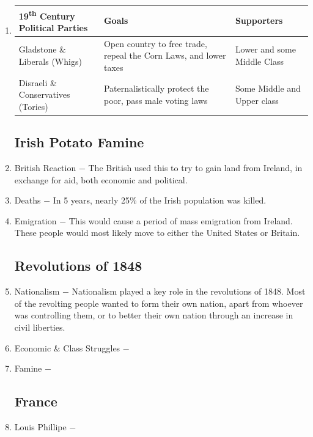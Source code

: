 \documentclass[12pt]{article}
\begin{document}
\begin{enumerate}
\item \begin{tabular}{p{} p{} p{}}
\hline
19\textsuperscript{th} Century Political Parties & Goals & Supporters \\
\hline
Gladstone \& Liberals (Whigs) & Open country to free trade, repeal the Corn Laws, and lower taxes & Lower and some Middle Class  \\
\hline
Disraeli \& Conservatives (Tories) & Paternalistically protect the poor, pass male voting laws & Some Middle and Upper class \\
\hline
\end{tabular}

\subsection{Irish Potato Famine}

\item British Reaction $-$ The British used this to try to gain land from Ireland, in exchange for aid, both economic and political. 

\item Deaths $-$ In 5 years, nearly 25\% of the Irish population was killed.

\item Emigration $-$ This would cause a period of mass emigration from Ireland. These people would most likely move to either the United States or Britain.

\subsection{Revolutions of 1848}

\item Nationalism $-$ Nationalism played a key role in the revolutions of 1848. Most of the revolting people wanted to form their own nation, apart from whoever was controlling them, or to better their own nation through an increase in civil liberties. 

\item Economic \& Class Struggles $-$ 

\item Famine $-$

\subsection{France}

\item Louis Phillipe $-$ 


\end{enumerate}
\end{document}
